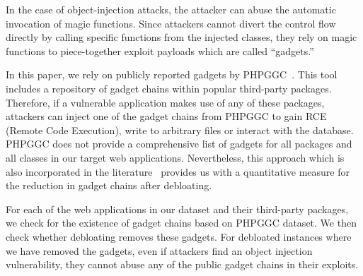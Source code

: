In the case of object-injection attacks, the attacker can abuse the automatic invocation of magic functions. Since attackers cannot divert the control flow directly by calling specific functions from the injected classes, they rely on magic functions to piece-together exploit payloads which are called ``gadgets.'' 


In this paper, we rely on publicly reported gadgets by PHPGGC~\cite{PHPGGC}. 
This tool includes a repository of gadget chains within popular third-party packages. 
Therefore, if a vulnerable application makes use of any of these packages, attackers can inject one of the gadget chains from PHPGGC to gain RCE (Remote Code Execution), write to arbitrary files or interact with the database. 
PHPGGC does not provide a comprehensive list of gadgets for all packages and all classes in our target web applications. 
Nevertheless, this approach which is also incorporated in the literature~\cite{lessismore} provides us with a quantitative measure for the reduction in gadget chains after debloating. 

For each of the web applications in our dataset and their third-party packages, we check for the existence of gadget chains based on PHPGGC dataset. 
We then check whether debloating removes these gadgets. 
For debloated instances where we have removed the gadgets, even if attackers find an object injection vulnerability, they cannot abuse any of the public gadget chains in their exploits. 
